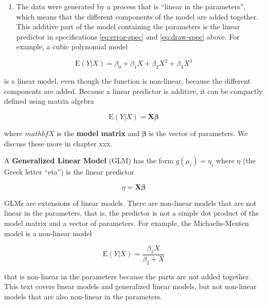 \documentclass[]{book}
\providecommand{\tightlist}{%
  \setlength{\itemsep}{0pt}\setlength{\parskip}{0pt}}
\begin{document}
\begin{enumerate}
\def\labelenumi{\arabic{enumi}.}
\tightlist
\item
  The data were generated by a process that is ``linear in the parameters'', which means that the different components of the model are added together. This additive part of the model containing the parameters is the linear predictor in specifications \eqref{eq:error-spec} and \eqref{eq:draw-spec} above. For example, a cubic polynomial model
\end{enumerate}

\begin{equation}
\mathrm{E}(Y|X) = \beta_0 + \beta_1 X + \beta_2 X^2 + \beta_3 X^3
\end{equation}

is a linear model, even though the function is non-linear, because the different components are added. Because a linear predictor is additive, it can be compactly defined using matrix algebra

\begin{equation}
\mathrm{E}(Y|X) = \mathbf{X}\boldsymbol{\beta}
\end{equation}

where \(mathbf{X}\) is the \textbf{model matrix} and \(\boldsymbol{\beta}\) is the vector of parameters. We discuss these more in chapter xxx.

A \textbf{Generalized Linear Model} (GLM) has the form \(g(\mu_i) = \eta_i\) where \(\eta\) (the Greek letter ``eta'') is the linear predictor

\begin{equation}
\eta = \mathbf{X}\boldsymbol{\beta} 
\end{equation}

GLMs are extensions of linear models. There are non-linear models that are not linear in the parameters, that is, the predictor is not a simple dot product of the model matrix and a vector of parameters. For example, the Michaelis-Menten model is a non-linear model

\begin{equation}
\mathrm{E}(Y|X)  = \frac{\beta_1 X}{\beta_2 + X}
\end{equation}

that is non-linear in the parameters because the parts are not added together. This text covers linear models and generalized linear models, but not non-linear models that are also non-linear in the parameters.
\end{document}

